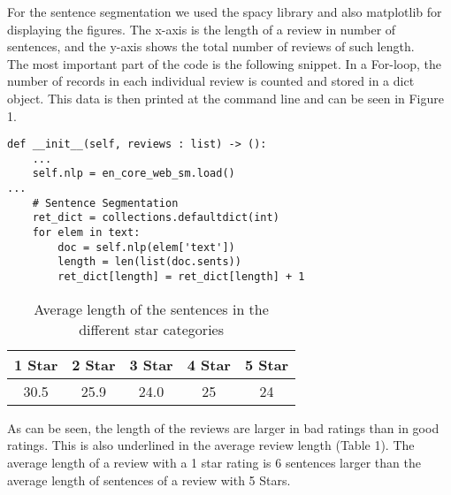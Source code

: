 For the sentence segmentation we used the spacy library and also matplotlib for displaying the figures. The x-axis is the length of a review in number of sentences, and the y-axis shows the total number of reviews of such length.\\
The most important part of the code is the following snippet. In a For-loop, the number of records in each individual review is counted and stored in a dict object. This data is then printed at the command line and can be seen in Figure 1.
\begin{Verbatim}[fontsize=\tiny]
def __init__(self, reviews : list) -> ():
	...
	self.nlp = en_core_web_sm.load()
...
	# Sentence Segmentation
	ret_dict = collections.defaultdict(int)
	for elem in text:
		doc = self.nlp(elem['text'])
		length = len(list(doc.sents))
		ret_dict[length] = ret_dict[length] + 1
\end{Verbatim}
	\begin{center}
		\begin{table}[!h]
			\caption{Average length of the sentences in the different star categories}
			\begin{tabular}{c | c | c | c | c}
				1 Star & 2 Star & 3 Star  & 4 Star & 5 Star\\\hline
				30.5 & 25.9 & 24.0  & 25 & 24\\
			\end{tabular}
		\end{table}
	\end{center}
	
As can be seen, the length of the reviews are larger in bad ratings than in good ratings. This is also underlined in the average review length (Table 1). The average length of a review with a 1 star rating is 6 sentences larger than the average length of sentences of a review with 5 Stars. 
	